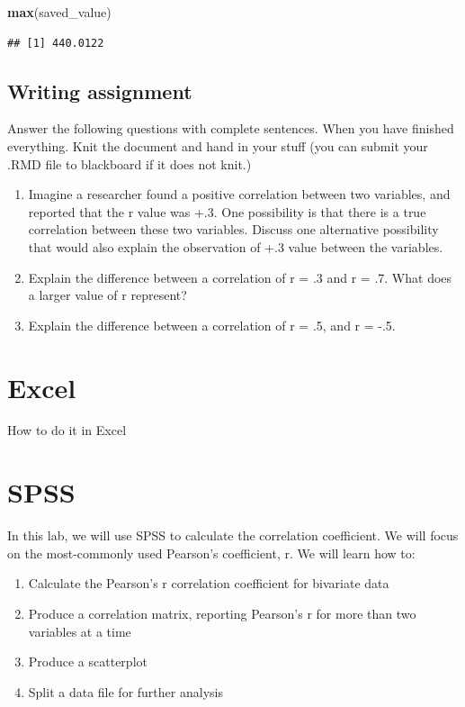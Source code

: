 \documentclass[]{book}
\newenvironment{Shaded}{\begin{snugshade}}{\end{snugshade}}
\newcommand{\KeywordTok}[1]{\textcolor[rgb]{0.13,0.29,0.53}{\textbf{#1}}}
\newcommand{\NormalTok}[1]{#1}
\providecommand{\tightlist}{%
  \setlength{\itemsep}{0pt}\setlength{\parskip}{0pt}}
\begin{document}
\begin{Shaded}
\begin{Highlighting}[]
\KeywordTok{max}\NormalTok{(saved_value)}
\end{Highlighting}
\end{Shaded}

\begin{verbatim}
## [1] 440.0122
\end{verbatim}

\subsection{Writing assignment}\label{writing-assignment-2}

Answer the following questions with complete sentences. When you have
finished everything. Knit the document and hand in your stuff (you can
submit your .RMD file to blackboard if it does not knit.)

\begin{enumerate}
\def\labelenumi{\arabic{enumi}.}
\item
  Imagine a researcher found a positive correlation between two
  variables, and reported that the r value was +.3. One possibility is
  that there is a true correlation between these two variables. Discuss
  one alternative possibility that would also explain the observation of
  +.3 value between the variables.
\item
  Explain the difference between a correlation of r = .3 and r = .7.
  What does a larger value of r represent?
\item
  Explain the difference between a correlation of r = .5, and r = -.5.
\end{enumerate}

\section{Excel}\label{excel-3}

How to do it in Excel

\section{SPSS}\label{spss-3}

In this lab, we will use SPSS to calculate the correlation coefficient.
We will focus on the most-commonly used Pearson's coefficient, r. We
will learn how to:

\begin{enumerate}
\def\labelenumi{\arabic{enumi}.}
\tightlist
\item
  Calculate the Pearson's r correlation coefficient for bivariate data
\item
  Produce a correlation matrix, reporting Pearson's r for more than two
  variables at a time
\item
  Produce a scatterplot
\item
  Split a data file for further analysis
\end{enumerate}
\end{document}
